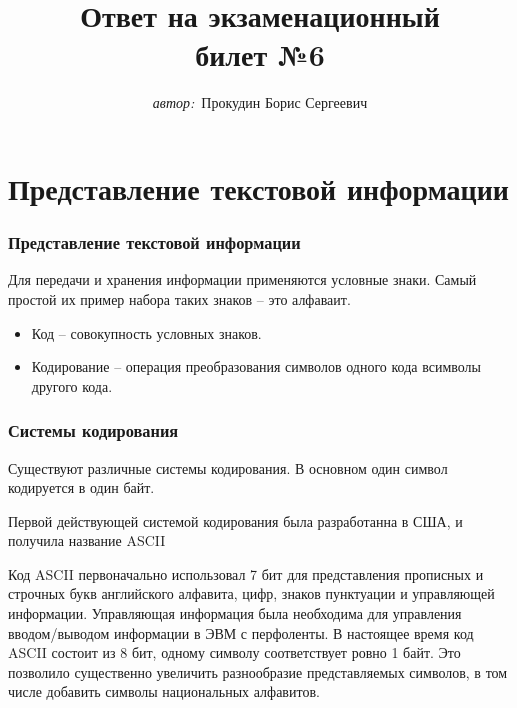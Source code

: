 \documentclass[14pt]{beamer}
\begin{document}
\title{\small{Ответ на экзаменационный \\ билет №6}}
\author{\small{%
\emph{автор:}~Прокудин Борис Сергеевич}}
\vspace{30pt}%
\vspace{60pt}%



\begin{frame}
\titlepage	
\end{frame}




\section{Представление текстовой информации}
\begin{frame}
\frametitle{\small Представление текстовой информации}

Для передачи и хранения информации применяются условные знаки. Самый простой их пример набора таких знаков -- это алфаваит.
\\
\begin{itemize}
\item Код -- совокупность условных знаков.
 
\item Кодирование -- операция преобразования символов одного кода всимволы другого кода.
\end{itemize}


\end{frame}



\begin{frame}
\frametitle{\small Системы кодирования}

Существуют различные системы кодирования. В основном один символ кодируется в один байт.


\small Первой действующей системой кодирования была разработанна в США, и получила название ASCII

\small Код ASCII первоначально использовал 7 бит для представления прописных и строчных букв английского алфавита, цифр, знаков пунктуации и управляющей информации. Управляющая информация была необходима для управления вводом/выводом информации в ЭВМ с перфоленты. В настоящее время код ASCII состоит из 8 бит, одному символу соответствует ровно 1 байт. Это позволило существенно увеличить разнообразие представляемых символов, в том числе добавить символы национальных алфавитов.


\end{frame}
  
\end{document}
